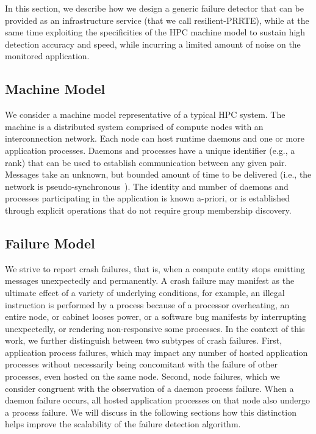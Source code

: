 \documentclass[sigconf]{acmart}
\newcommand{\prrte}[0]{\textsc{PRRTE}\xspace}
\begin{document}
In this section, we describe how we design a generic failure detector that can
be provided 
as an infrastructure service (that we call resilient-\prrte), while at the same time exploiting the 
specificities of the HPC machine model to sustain high detection accuracy 
and speed, while incurring a limited amount of noise on the monitored application. 

\subsection{Machine Model}

We consider a machine model representative of a typical HPC system. 
The machine is a distributed system comprised of compute nodes with an 
interconnection network. Each 
node can host runtime daemons and one or more application processes. Daemons 
and processes have a unique identifier (e.g., a rank) that can be used
to establish communication between any given pair. Messages take an unknown,
but bounded amount of time to be delivered (i.e., the network is pseudo-synchronous~\cite{Chandra96}).
 The identity and number of daemons and processes participating in the application is known a-priori, 
or is established through explicit operations that do not require group 
membership discovery. 

\subsection{Failure Model}

We strive to report crash failures, that is, when a compute entity stops emitting 
messages unexpectedly and permanently. A crash failure may manifest as
the ultimate effect of a variety of underlying conditions, for example, an illegal instruction 
is performed by a process because of a processor overheating, an entire 
node, or cabinet looses power, or a software bug manifests by interrupting 
unexpectedly, or rendering non-responsive some processes. In the context of 
this work, we further distinguish between two subtypes of crash failures.
First, application process failures, which may impact any number of 
hosted application processes without necessarily being concomitant
with the failure of other processes, even hosted on the same node.
Second, node failures, which we consider congruent with the observation of a daemon 
process failure. When a daemon failure occurs, all hosted application processes on
that node also undergo a process failure. We will discuss in the following 
sections how this distinction helps improve the scalability of the failure 
detection algorithm. 
\end{document}
